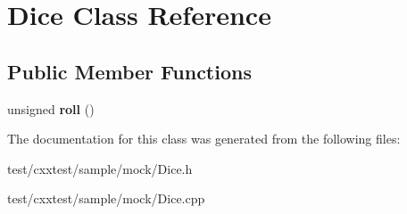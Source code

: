 \hypertarget{classDice}{\section{Dice Class Reference}
\label{classDice}
}
\subsection*{Public Member Functions}
\begin{DoxyCompactItemize}
\item 
\hypertarget{classDice_a33aecf673e51d0da868a1ca0b9c0b753}{unsigned {\bfseries roll} ()}\label{classDice_a33aecf673e51d0da868a1ca0b9c0b753}

\end{DoxyCompactItemize}


The documentation for this class was generated from the following files\-:\begin{DoxyCompactItemize}
\item 
test/cxxtest/sample/mock/Dice.\-h\item 
test/cxxtest/sample/mock/Dice.\-cpp\end{DoxyCompactItemize}
